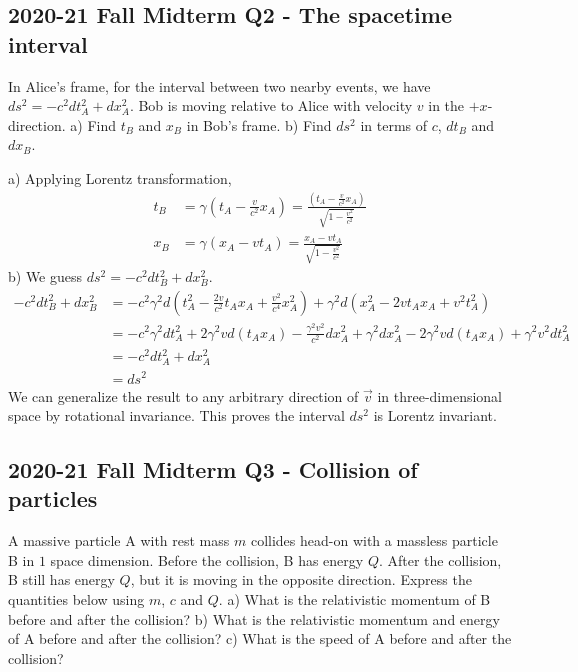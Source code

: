 \documentclass[12pt]{book} %
\numberwithin{equation}{chapter}
\def\c{\gamma}
\begin{document}
\subsection*{2020-21 Fall Midterm Q2 - The spacetime interval}
\label{The spacetime interval}
In Alice's frame, for the interval between two nearby events, we have $ds^2=-c^2 dt_{A}^2+dx_{A}^2$. Bob is moving relative to Alice with velocity $v$ in the $+x$-direction.\bigskip\newline
a) Find $t_{B}$ and $x_{B}$ in Bob's frame.\bigskip\newline
b) Find $ds^2$ in terms of $c$, $dt_{B}$ and $dx_{B}$.

\begin{solbox}
a) Applying Lorentz transformation,
\begin{align*}
t_{B}&=\c\left(t_{A}-\frac{v}{c^2}x_{A}\right)=\frac{\left(t_{A}-\frac{v}{c^2}x_{A}\right)}{\sqrt{1-\frac{v^2}{c^2}}}\\
x_{B}&=\c\left(x_{A}-vt_{A}\right)=\frac{x_{A}-vt_{A}}{\sqrt{1-\frac{v^2}{c^2}}}
\end{align*}
b) We guess $ds^2=-c^2dt_{B}^2+dx_{B}^2$.
\begin{align*}
-c^2dt_{B}^2+dx_{B}^2&=-c^2{\c}^2d\left(t_{A}^2-\frac{2v}{c^2}t_{A}x_{A}+\frac{v^2}{c^4}x_{A}^2\right)+{\c}^2 d\left(x_{A}^2-2vt_{A}x_{A}+v^2 t_{A}^2\right)\\
&=-c^2 {\c}^2dt_{A}^2+2{\c}^2 vd\left(t_{A}x_{A}\right)-\frac{{\c}^2 v^2}{c^2}dx_{A}^2+{\c}^2 dx_{A}^2-2{\c}^2 vd\left(t_{A}x_{A}\right)+{\c}^2 v^2dt_{A}^2\\
&=-c^2 dt_{A}^2+dx_{A}^2\\
&=ds^2
\end{align*}
We can generalize the result to any arbitrary direction of $\vec{v}$ in three-dimensional space by rotational invariance. This proves the interval $ds^2$ is Lorentz invariant.
\end{solbox}

\subsection*{2020-21 Fall Midterm Q3 - Collision of particles}
A massive particle A with rest mass $m$ collides head-on with a massless particle B in $1$ space dimension. Before the collision, B has energy $Q$. After the collision, B still has energy $Q$, but it is moving in the opposite direction. Express the quantities below using $m$, $c$ and $Q$.\bigskip\newline
a) What is the relativistic momentum of B before and after the collision?\bigskip\newline
b) What is the relativistic momentum and energy of A before and after the collision?\bigskip\newline
c) What is the speed of A before and after the collision?
\end{document}

